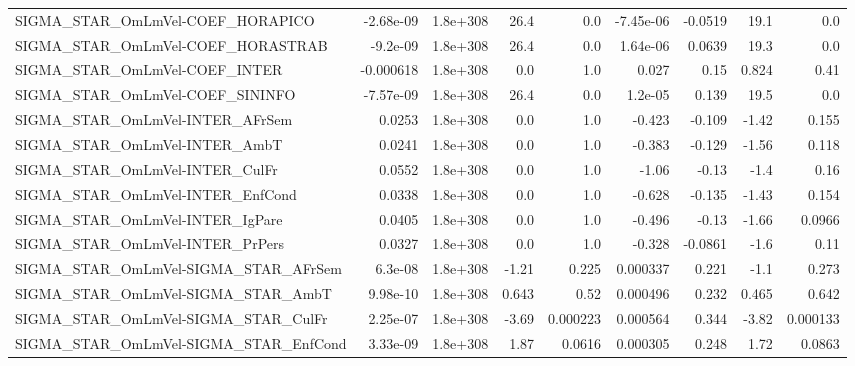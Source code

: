 \begin{tabular}{lrrrrrrrr}
SIGMA\_STAR\_OmLmVel-COEF\_HORAPICO      &   -2.68e-09 &     1.8e+308 &    26.4 &      0.0 &  -7.45e-06 &     -0.0519 &         19.1 &           0.0 \\
SIGMA\_STAR\_OmLmVel-COEF\_HORASTRAB     &    -9.2e-09 &     1.8e+308 &    26.4 &      0.0 &   1.64e-06 &      0.0639 &         19.3 &           0.0 \\
SIGMA\_STAR\_OmLmVel-COEF\_INTER         &   -0.000618 &     1.8e+308 &     0.0 &      1.0 &      0.027 &        0.15 &        0.824 &          0.41 \\
SIGMA\_STAR\_OmLmVel-COEF\_SININFO       &   -7.57e-09 &     1.8e+308 &    26.4 &      0.0 &    1.2e-05 &       0.139 &         19.5 &           0.0 \\
SIGMA\_STAR\_OmLmVel-INTER\_AFrSem       &      0.0253 &     1.8e+308 &     0.0 &      1.0 &     -0.423 &      -0.109 &        -1.42 &         0.155 \\
SIGMA\_STAR\_OmLmVel-INTER\_AmbT         &      0.0241 &     1.8e+308 &     0.0 &      1.0 &     -0.383 &      -0.129 &        -1.56 &         0.118 \\
SIGMA\_STAR\_OmLmVel-INTER\_CulFr        &      0.0552 &     1.8e+308 &     0.0 &      1.0 &      -1.06 &       -0.13 &         -1.4 &          0.16 \\
SIGMA\_STAR\_OmLmVel-INTER\_EnfCond      &      0.0338 &     1.8e+308 &     0.0 &      1.0 &     -0.628 &      -0.135 &        -1.43 &         0.154 \\
SIGMA\_STAR\_OmLmVel-INTER\_IgPare       &      0.0405 &     1.8e+308 &     0.0 &      1.0 &     -0.496 &       -0.13 &        -1.66 &        0.0966 \\
SIGMA\_STAR\_OmLmVel-INTER\_PrPers       &      0.0327 &     1.8e+308 &     0.0 &      1.0 &     -0.328 &     -0.0861 &         -1.6 &          0.11 \\
SIGMA\_STAR\_OmLmVel-SIGMA\_STAR\_AFrSem  &     6.3e-08 &     1.8e+308 &   -1.21 &    0.225 &   0.000337 &       0.221 &         -1.1 &         0.273 \\
SIGMA\_STAR\_OmLmVel-SIGMA\_STAR\_AmbT    &    9.98e-10 &     1.8e+308 &   0.643 &     0.52 &   0.000496 &       0.232 &        0.465 &         0.642 \\
SIGMA\_STAR\_OmLmVel-SIGMA\_STAR\_CulFr   &    2.25e-07 &     1.8e+308 &   -3.69 & 0.000223 &   0.000564 &       0.344 &        -3.82 &      0.000133 \\
SIGMA\_STAR\_OmLmVel-SIGMA\_STAR\_EnfCond &    3.33e-09 &     1.8e+308 &    1.87 &   0.0616 &   0.000305 &       0.248 &         1.72 &        0.0863 \\

\end{tabular}
